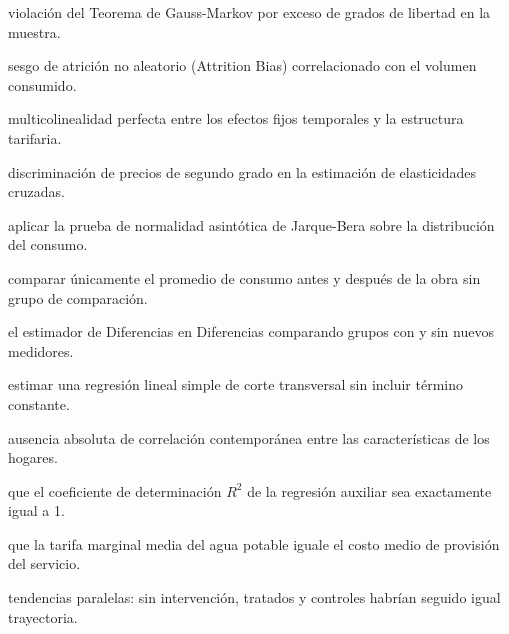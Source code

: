 \begin{opts}
    \item violación del Teorema de Gauss-Markov por exceso de grados de libertad en la muestra.
    \item sesgo de atrición no aleatorio (Attrition Bias) correlacionado con el volumen consumido.
    \item multicolinealidad perfecta entre los efectos fijos temporales y la estructura tarifaria.
    \item discriminación de precios de segundo grado en la estimación de elasticidades cruzadas.
\end{opts}

\begin{opts}
    \item aplicar la prueba de normalidad asintótica de Jarque-Bera sobre la distribución del consumo.
    \item comparar únicamente el promedio de consumo antes y después de la obra sin grupo de comparación.
    \item el estimador de Diferencias en Diferencias comparando grupos con y sin nuevos medidores.
    \item estimar una regresión lineal simple de corte transversal sin incluir término constante.
\end{opts}

\begin{opts}
    \item ausencia absoluta de correlación contemporánea entre las características de los hogares.
    \item que el coeficiente de determinación $R^2$ de la regresión auxiliar sea exactamente igual a 1.
    \item que la tarifa marginal media del agua potable iguale el costo medio de provisión del servicio.
    \item tendencias paralelas: sin intervención, tratados y controles habrían seguido igual trayectoria.
\end{opts}


